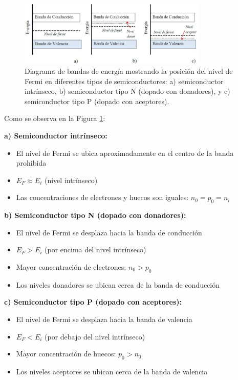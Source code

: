 \documentclass[
  11pt,
  letterpaper,
   addpoints,
   answers
  ]{exam}
\begin{document}
\begin{questions}
\begin{solution}
\begin{figure}[H]
    \centering
    \includegraphics[width=0.8\textwidth]{../figures/Auxiliar_2_5}
    \caption{Diagrama de bandas de energía mostrando la posición del nivel de Fermi en diferentes tipos de semiconductores: a) semiconductor intrínseco, b) semiconductor tipo N (dopado con donadores), y c) semiconductor tipo P (dopado con aceptores).}
    \label{fig:fermi}
\end{figure}
Como se observa en la Figura \ref{fig:fermi}:

\textbf{a) Semiconductor intrínseco:}
\begin{itemize}
    \item El nivel de Fermi se ubica aproximadamente en el centro de la banda prohibida
    \item $E_F \approx E_i$ (nivel intrínseco)
    \item Las concentraciones de electrones y huecos son iguales: $n_0 = p_0 = n_i$
\end{itemize}

\textbf{b) Semiconductor tipo N (dopado con donadores):}
\begin{itemize}
    \item El nivel de Fermi se desplaza hacia la banda de conducción
    \item $E_F > E_i$ (por encima del nivel intrínseco)
    \item Mayor concentración de electrones: $n_0 > p_0$
    \item Los niveles donadores se ubican cerca de la banda de conducción
\end{itemize}

\textbf{c) Semiconductor tipo P (dopado con aceptores):}
\begin{itemize}
    \item El nivel de Fermi se desplaza hacia la banda de valencia
    \item $E_F < E_i$ (por debajo del nivel intrínseco)
    \item Mayor concentración de huecos: $p_0 > n_0$
    \item Los niveles aceptores se ubican cerca de la banda de valencia
\end{itemize}


\end{solution}
\end{questions}
\end{document}
